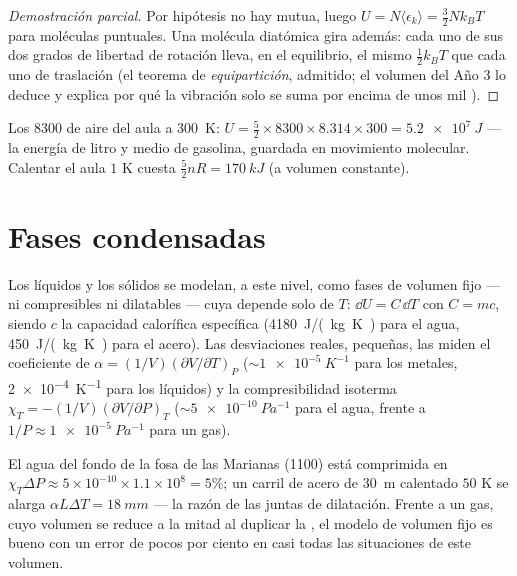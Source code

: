 \begin{proof}[Demostración parcial]
Por hipótesis no hay  mutua, luego $U = N\langle\epsilon_k\rangle
= \tfrac32 Nk_BT$ para moléculas puntuales. Una molécula diatómica gira
además: cada uno de sus dos grados de libertad de rotación lleva, en el
equilibrio, el mismo $\tfrac12 k_BT$ que cada uno de traslación (el teorema
de \emph{equipartición}, admitido; el volumen del Año 3 lo deduce y
explica por qué la vibración solo se suma por encima de unos mil ).
\end{proof}

\begin{example}\label{ex:b1:kinetic-theory:room}
Los \qty{8300}{} de aire del aula a \qty{300}{K}: $U = \tfrac52 \times
8300 \times 8.314 \times 300 = \qty{5.2e7}{J}$ --- la energía de litro y
medio de gasolina, guardada en movimiento molecular. Calentar el aula $1$ K
cuesta $\tfrac52 nR = \qty{170}{kJ}$ (a volumen constante).
\end{example}

\section{Fases condensadas}

\begin{proposition}\label{prop:b1:kinetic-theory:condensed}
Los líquidos y los sólidos se modelan, a este nivel, como fases de volumen
fijo --- ni compresibles ni dilatables --- cuya  depende
solo de $T$: $\dd U = C\,\dd T$ con $C = mc$, siendo $c$ la capacidad
calorífica específica (\qty{4180}{J/(kg.K)} para el agua,
\qty{450}{J/(kg.K)} para el acero). Las desviaciones reales, pequeñas, las
miden el coeficiente de 
$\alpha = (1/V)(\partial V/\partial T)_P$ ($\sim\qty{1e-5}{K^{-1}}$ para los
metales, \qty{2e-4}{K^{-1}} para los líquidos) y la compresibilidad
isoterma $\chi_T = -(1/V)(\partial V/\partial P)_T$ ($\sim\qty{5e-10}{Pa^{-1}}$
para el agua, frente a $1/P \approx \qty{1e-5}{Pa^{-1}}$ para un gas).
\end{proposition}
\admitted

\begin{example}\label{ex:b1:kinetic-theory:water}
El agua del fondo de la fosa de las Marianas (\qty{1100}{}) está
comprimida en $\chi_T\Delta P \approx 5\times10^{-10} \times 1.1\times10^8 = 5\%$;
un carril de acero de \qty{30}{m} calentado $50$ K se alarga $\alpha L\Delta T =
\qty{18}{mm}$ --- la razón de las juntas de dilatación. Frente a un gas,
cuyo volumen se reduce a la mitad al duplicar la , el modelo de
volumen fijo es bueno con un error de pocos por ciento en casi todas las
situaciones de este volumen.
\end{example}


